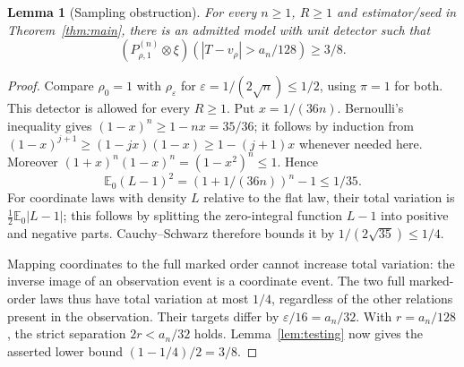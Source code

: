 \documentclass[11pt]{article}
\newtheorem{lemma}[theorem]{Lemma}
\theoremstyle{remark}
\newcommand{\E}{\mathbb E}
\begin{document}
\begin{lemma}[Sampling obstruction]\label{lem:sampling}
For every $n\ge1$, $R\ge1$ and estimator/seed in
Theorem~\ref{thm:main}, there is an admitted model with unit detector
such that
\[
 (P_{\rho,1}^{(n)}\otimes\xi)(|T-v_\rho|>a_n/128)\ge3/8.
\]
\end{lemma}
\begin{proof}
Compare $\rho_0=1$ with $\rho_\varepsilon$ for
$\varepsilon=1/(2\sqrt n)\le1/2$, using $\pi=1$ for both.
This detector is allowed for every $R\ge1$.
Put $x=1/(36n)$. Bernoulli's inequality gives
$(1-x)^n\ge1-nx=35/36$; it follows by induction from
$(1-x)^{j+1}\ge(1-jx)(1-x)\ge1-(j+1)x$ whenever needed here.
Moreover $(1+x)^n(1-x)^n=(1-x^2)^n\le1$. Hence
\[
 \E_0(L-1)^2=(1+1/(36n))^n-1\le1/35.
\]
For coordinate laws with density $L$ relative to the flat law, their
total variation is $\tfrac12\E_0|L-1|$; this follows by splitting the
zero-integral function $L-1$ into positive and negative parts.
Cauchy--Schwarz therefore bounds it by $1/(2\sqrt{35})\le1/4$.

Mapping coordinates to the full marked order cannot increase total
variation: the inverse image of an observation event is a coordinate
event. The two full marked-order laws thus have total variation at most
$1/4$, regardless of the other relations present in the observation.
Their targets differ by $\varepsilon/16=a_n/32$. With $r=a_n/128$,
the strict separation $2r<a_n/32$ holds. Lemma~\ref{lem:testing} now
gives the asserted lower bound $(1-1/4)/2=3/8$.
\end{proof}
\end{document}
